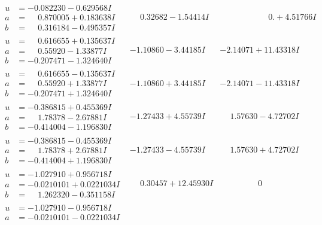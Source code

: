 \documentclass[1p]{elsarticle_modified}
\theoremstyle{definition}
\begin{document}
$$\begin{array}{c|c|c}
 \hline 
\begin{aligned}
u &= -0.082230 - 0.629568 I \\
a &= \phantom{-}0.870005 + 0.183638 I \\
b &= \phantom{-}0.316184 - 0.495357 I\end{aligned}
 & \phantom{-}0.32682 - 1.54414 I & \phantom{-0.000000 -}0. + 4.51766 I \\ \hline\begin{aligned}
u &= \phantom{-}0.616655 + 0.135637 I \\
a &= \phantom{-}0.55920 - 1.33877 I \\
b &= -0.207471 - 1.324640 I\end{aligned}
 & -1.10860 - 3.44185 I & -2.14071 + 11.43318 I \\ \hline\begin{aligned}
u &= \phantom{-}0.616655 - 0.135637 I \\
a &= \phantom{-}0.55920 + 1.33877 I \\
b &= -0.207471 + 1.324640 I\end{aligned}
 & -1.10860 + 3.44185 I & -2.14071 - 11.43318 I \\ \hline\begin{aligned}
u &= -0.386815 + 0.455369 I \\
a &= \phantom{-}1.78378 - 2.67881 I \\
b &= -0.414004 - 1.196830 I\end{aligned}
 & -1.27433 + 4.55739 I & \phantom{-}1.57630 - 4.72702 I \\ \hline\begin{aligned}
u &= -0.386815 - 0.455369 I \\
a &= \phantom{-}1.78378 + 2.67881 I \\
b &= -0.414004 + 1.196830 I\end{aligned}
 & -1.27433 - 4.55739 I & \phantom{-}1.57630 + 4.72702 I \\ \hline\begin{aligned}
u &= -1.027910 + 0.956718 I \\
a &= -0.0210101 + 0.0221034 I \\
b &= \phantom{-}1.262320 - 0.351158 I\end{aligned}
 & \phantom{-}0.30457 + 12.45930 I & \phantom{-0.000000 } 0 \\ \hline\begin{aligned}
u &= -1.027910 - 0.956718 I \\
a &= -0.0210101 - 0.0221034 I \\

\end{aligned}
\end{array}$$
\end{document}
